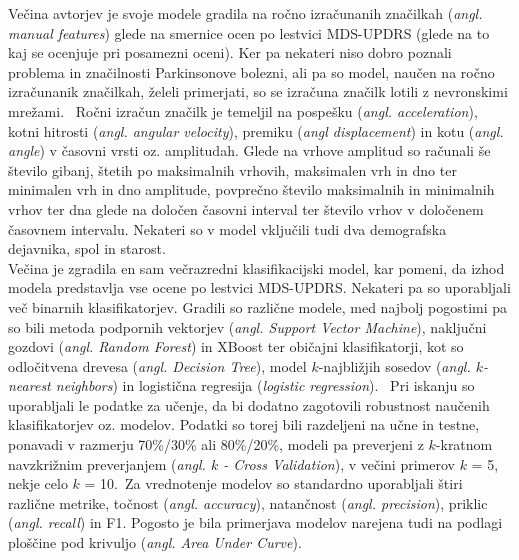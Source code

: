\documentclass[a4paper,12pt]{article}
\begin{document}
Večina avtorjev je svoje modele gradila na ročno izračunanih značilkah (\textit{angl. manual features}) glede na 
smernice ocen po lestvici MDS-UPDRS (glede na to kaj se ocenjuje pri posamezni oceni). Ker pa nekateri 
niso dobro poznali problema in značilnosti Parkinsonove bolezni, ali pa so model, naučen na ročno izračunanik 
značilkah, želeli primerjati, so se izračuna značilk lotili z nevronskimi mrežami. \
Ročni izračun značilk je temeljil na pospešku (\textit{angl. acceleration}), kotni hitrosti (\textit{angl. angular velocity}), 
premiku (\textit{angl displacement}) in kotu (\textit{angl. angle}) v časovni vrsti oz. amplitudah. Glede na vrhove amplitud 
so računali še število gibanj, štetih po maksimalnih vrhovih, maksimalen vrh in dno ter minimalen vrh in dno 
amplitude, povprečno število maksimalnih in minimalnih vrhov ter dna glede na določen časovni interval ter 
število vrhov v določenem časovnem intervalu. Nekateri so v model vključili tudi dva demografska dejavnika, 
spol in starost. \\

Večina je zgradila en sam večrazredni klasifikacijski model, kar pomeni, da izhod modela predstavlja vse 
ocene po lestvici MDS-UPDRS. Nekateri pa so uporabljali več binarnih klasifikatorjev. Gradili so različne 
modele, med najbolj pogostimi pa so bili metoda podpornih vektorjev (\textit{angl. Support Vector Machine}), naključni 
gozdovi (\textit{angl. Random Forest}) in XBoost ter običajni klasifikatorji, kot so odločitvena drevesa (\textit{angl. Decision 
Tree}), model $k$-najbližjih sosedov (\textit{angl. $k$-nearest neighbors}) in logistična regresija (\textit{logistic 
regression}). \
Pri iskanju so uporabljali le podatke za učenje, da bi dodatno 
zagotovili robustnost naučenih klasifikatorjev oz. modelov. Podatki so torej bili razdeljeni na učne in 
testne, ponavadi v razmerju 70\%/30\% ali 80\%/20\%, modeli pa preverjeni z $k$-kratnom navzkrižnim 
preverjanjem (\textit{angl. $k$ - Cross Validation}), v večini primerov $k$ = 5, nekje celo $k$ = 10.\
Za vrednotenje modelov so standardno uporabljali štiri različne metrike, točnost (\textit{angl. accuracy}), 
natančnost (\textit{angl. precision}), priklic (\textit{angl. recall}) in F1. Pogosto je bila primerjava modelov narejena 
tudi na podlagi ploščine pod krivuljo (\textit{angl. Area Under Curve}). 

\end{document}
